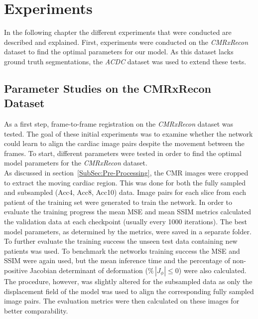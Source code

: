 \documentclass[english,version-2022-01]{uzl-thesis} %
\begin{document}
\chapter{Experiments} \label{Ch:Experiments}
In the following chapter the different experiments that were conducted are described and explained. 
First, experiments were conducted on the \emph{CMRxRecon} dataset to find the optimal parameters for our model. As this dataset lacks ground truth segmentations, the \emph{ACDC} dataset was used to extend these tests.


\section{Parameter Studies on the CMRxRecon Dataset} \label{Sec:ParameterStudies}
As a first step, frame-to-frame registration on the \emph{CMRxRecon} dataset was tested. The goal of these initial experiments was to examine whether the network could learn to align the cardiac image pairs despite the movement between the frames. To start, different parameters were tested in order to find the optimal model parameters for the \emph{CMRxRecon} dataset. 
\\
As discussed in section~\ref{SubSec:Pre-Processing}, the CMR images were cropped to extract the moving cardiac region. This was done for both the fully sampled and subsampled (Acc4, Acc8, Acc10) data. Image pairs for each slice from each patient of the training set were generated to train the network. In order to evaluate the training progress the mean MSE and mean SSIM metrics calculated the validation data at each checkpoint (usually every 1000 iterations). The best model parameters, as determined by the metrics, were saved in a separate folder. To further evaluate the training success the unseen test data containing new patients was used. To benchmark the networks training success the MSE and SSIM were again used, but the mean inference time and the percentage of non-positive Jacobian determinant of deformation ($\% \, |J_{\phi}|\leq0$) were also calculated. The procedure, however, was slightly altered for the subsampled data as only the displacement field of the model was used to align the corresponding fully sampled image pairs. The evaluation metrics were then calculated on these images for better comparability.
\end{document}
